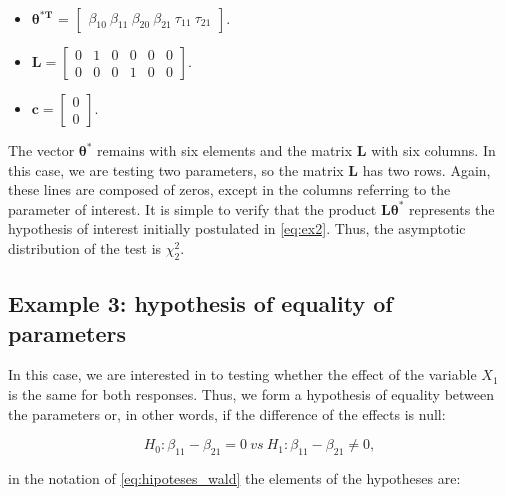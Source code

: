 \documentclass[Review,sagev,times, doublespace]{sagej}
\begin{document}
\begin{itemize}
  
  \item $\boldsymbol{\theta^{*T}}$ = $\begin{bmatrix} \beta_{10} \  \beta_{11} \ \beta_{20} \ \beta_{21} \ \tau_{11} \ \tau_{21} \end{bmatrix}$.


\item $\boldsymbol{L} = \begin{bmatrix} 0 & 1 & 0 & 0 & 0 & 0 \\
0 & 0 & 0 & 1 & 0 & 0 \end{bmatrix}.$
 
\item $\boldsymbol{c} = \begin{bmatrix} 0 \\ 0 \end{bmatrix}.$ 

\end{itemize}

The vector $\boldsymbol{\theta^{*}}$ remains with six elements and the matrix $\boldsymbol{L}$ with six columns. In this case, we are testing two parameters, so the matrix $\boldsymbol{L}$ has two rows. Again, these lines are composed of zeros, except in the columns referring to the parameter of interest. It is simple to verify that the product $\boldsymbol{L}\boldsymbol{\theta^{*}}$ represents the hypothesis of interest initially postulated in \autoref{eq:ex2}. Thus, the asymptotic distribution of the test is $\chi^2_2$.

\subsection{Example 3: hypothesis of equality of parameters}

In this case, we are interested in to testing whether the effect of the variable $X_1$ is the same for both responses. Thus, we form a hypothesis of equality between the parameters or, in other words, if the difference of the effects is null:

\begin{equation}
\label{eq:ex3}
H_0: \beta_{11} - \beta_{21} = 0 \ vs \ H_1: \beta_{11} - \beta_{21} \neq 0,
\end{equation}

\noindent in the notation of \autoref{eq:hipoteses_wald} the elements of the hypotheses are:
\end{document}
